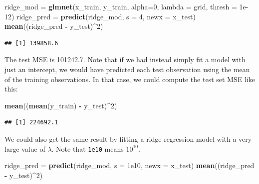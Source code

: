 \documentclass[openany]{book}
\newenvironment{Shaded}{\begin{snugshade}}{\end{snugshade}}
\newcommand{\DataTypeTok}[1]{\textcolor[rgb]{0.13,0.29,0.53}{#1}}
\newcommand{\DecValTok}[1]{\textcolor[rgb]{0.00,0.00,0.81}{#1}}
\newcommand{\FloatTok}[1]{\textcolor[rgb]{0.00,0.00,0.81}{#1}}
\newcommand{\KeywordTok}[1]{\textcolor[rgb]{0.13,0.29,0.53}{\textbf{#1}}}
\newcommand{\NormalTok}[1]{#1}
\newcommand{\OperatorTok}[1]{\textcolor[rgb]{0.81,0.36,0.00}{\textbf{#1}}}
\newcommand{\StringTok}[1]{\textcolor[rgb]{0.31,0.60,0.02}{#1}}
\begin{document}
\begin{Shaded}
\begin{Highlighting}[]
\NormalTok{ridge_mod =}\StringTok{ }\KeywordTok{glmnet}\NormalTok{(x_train, y_train, }\DataTypeTok{alpha=}\DecValTok{0}\NormalTok{, }\DataTypeTok{lambda =}\NormalTok{ grid, }\DataTypeTok{thresh =} \FloatTok{1e-12}\NormalTok{)}
\NormalTok{ridge_pred =}\StringTok{ }\KeywordTok{predict}\NormalTok{(ridge_mod, }\DataTypeTok{s =} \DecValTok{4}\NormalTok{, }\DataTypeTok{newx =}\NormalTok{ x_test)}
\KeywordTok{mean}\NormalTok{((ridge_pred }\OperatorTok{-}\StringTok{ }\NormalTok{y_test)}\OperatorTok{^}\DecValTok{2}\NormalTok{)}
\end{Highlighting}
\end{Shaded}

\begin{verbatim}
## [1] 139858.6
\end{verbatim}

The test MSE is 101242.7. Note that if we had instead simply fit a model
with just an intercept, we would have predicted each test observation using
the mean of the training observations. In that case, we could compute the
test set MSE like this:

\begin{Shaded}
\begin{Highlighting}[]
\KeywordTok{mean}\NormalTok{((}\KeywordTok{mean}\NormalTok{(y_train) }\OperatorTok{-}\StringTok{ }\NormalTok{y_test)}\OperatorTok{^}\DecValTok{2}\NormalTok{)}
\end{Highlighting}
\end{Shaded}

\begin{verbatim}
## [1] 224692.1
\end{verbatim}

We could also get the same result by fitting a ridge regression model with
a very large value of \(\lambda\). Note that \texttt{1e10} means \(10^{10}\).

\begin{Shaded}
\begin{Highlighting}[]
\NormalTok{ridge_pred =}\StringTok{ }\KeywordTok{predict}\NormalTok{(ridge_mod, }\DataTypeTok{s =} \FloatTok{1e10}\NormalTok{, }\DataTypeTok{newx =}\NormalTok{ x_test)}
\KeywordTok{mean}\NormalTok{((ridge_pred }\OperatorTok{-}\StringTok{ }\NormalTok{y_test)}\OperatorTok{^}\DecValTok{2}\NormalTok{)}
\end{Highlighting}
\end{Shaded}
\end{document}

